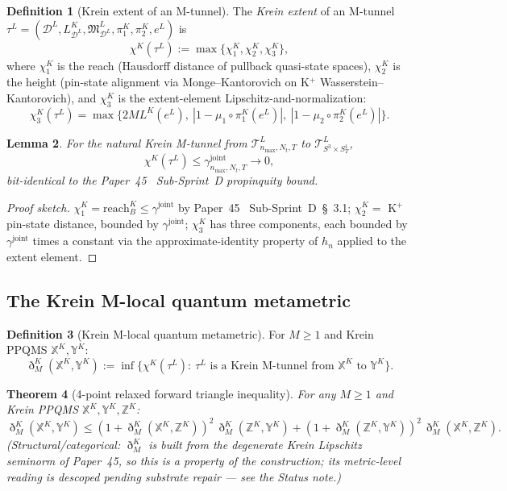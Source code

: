 \documentclass[11pt,a4paper]{article}
\theoremstyle{plain}
\newtheorem{theorem}{Theorem}[section]
\newtheorem{lemma}[theorem]{Lemma}
\theoremstyle{definition}
\newtheorem{definition}[theorem]{Definition}
\newcommand{\nmax}{n_{\max}}
\newcommand{\Nt}{N_{t}}
\newcommand{\Manifold}{S^{3}\times S^{1}_{T}}
\newcommand{\Tcal}{\mathcal{T}}
\newcommand{\Dcal}{\mathcal{D}}
\newcommand{\gammajoint}{\gamma^{\mathrm{joint}}}
\newcommand{\Dethmet}{\eth^{K}}
\begin{document}
\begin{definition}[Krein extent of an M-tunnel]\label{def:krein_extent}
The \emph{Krein extent} of an M-tunnel $\tau^{L} = (\Dcal^{L},
L_{\Dcal^{L}}^{K}, \mathfrak{M}_{\Dcal^{L}}^{L}, \pi_{1}^{K},
\pi_{2}^{K}, e^{L})$ is
\[
\chi^{K}(\tau^{L}) := \max\{\chi_{1}^{K}, \chi_{2}^{K}, \chi_{3}^{K}\},
\]
where $\chi_{1}^{K}$ is the reach (Hausdorff distance of pullback
quasi-state spaces), $\chi_{2}^{K}$ is the height (pin-state alignment
via Monge--Kantorovich on K$^{+}$ Wasserstein--Kantorovich), and
$\chi_{3}^{K}$ is the extent-element Lipschitz-and-normalization:
\[
\chi_{3}^{K}(\tau^{L}) = \max\{2M L^{K}(e^{L}),\
|1 - \mu_{1}\circ\pi_{1}^{K}(e^{L})|,\
|1 - \mu_{2}\circ\pi_{2}^{K}(e^{L})|\}.
\]
\end{definition}

\begin{lemma}\label{lem:extent_bound}
For the natural Krein M-tunnel from $\Tcal^{L}_{\nmax, \Nt, T}$ to
$\Tcal^{L}_{\Manifold}$,
\[
\chi^{K}(\tau^{L}) \le \gammajoint_{\nmax, \Nt, T} \to 0,
\]
bit-identical to the Paper~45~\cite{paper45} Sub-Sprint~D propinquity
bound.
\end{lemma}

\begin{proof}[Proof sketch]
$\chi_{1}^{K} = \mathrm{reach}_{B}^{K} \le \gammajoint$ by
Paper~45~\cite{paper45} Sub-Sprint~D~\S~3.1;
$\chi_{2}^{K} = $ K$^{+}$ pin-state distance, bounded by $\gammajoint$;
$\chi_{3}^{K}$ has three components, each bounded by $\gammajoint$
times a constant via the approximate-identity property of $h_{n}$
applied to the extent element.
\end{proof}

\subsection{The Krein M-local quantum metametric}\label{sec:krein_mlocal_metametric}

\begin{definition}[Krein M-local quantum metametric]\label{def:krein_mlocal}
For $M \ge 1$ and Krein PPQMS $\mathbb{X}^{K}, \mathbb{Y}^{K}$:
\[
\Dethmet_{M}(\mathbb{X}^{K}, \mathbb{Y}^{K})
:= \inf\{\chi^{K}(\tau^{L}) :\ \tau^{L} \text{ is a Krein M-tunnel from }
\mathbb{X}^{K} \text{ to } \mathbb{Y}^{K}\}.
\]
\end{definition}

\begin{theorem}[4-point relaxed forward triangle inequality]\label{thm:relaxed_triangle}
For any $M \ge 1$ and Krein PPQMS $\mathbb{X}^{K}, \mathbb{Y}^{K},
\mathbb{Z}^{K}$:
\[
\Dethmet_{M}(\mathbb{X}^{K}, \mathbb{Y}^{K}) \le
(1 + \Dethmet_{M}(\mathbb{X}^{K}, \mathbb{Z}^{K}))^{2}\,
\Dethmet_{M}(\mathbb{Z}^{K}, \mathbb{Y}^{K}) +
(1 + \Dethmet_{M}(\mathbb{Z}^{K}, \mathbb{Y}^{K}))^{2}\,
\Dethmet_{M}(\mathbb{X}^{K}, \mathbb{Z}^{K}).
\]
\emph{(Structural/categorical: $\Dethmet_{M}$ is built from the
degenerate Krein Lipschitz seminorm of Paper~45, so this is a property
of the construction; its metric-level reading is descoped pending
substrate repair --- see the Status note.)}
\end{theorem}
\end{document}
